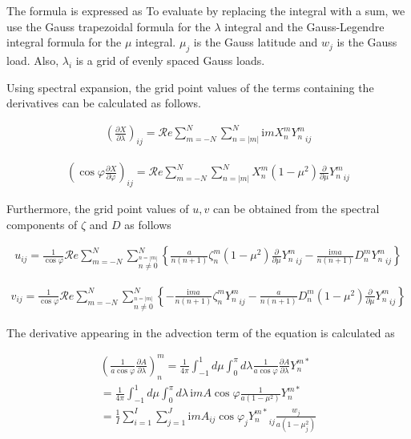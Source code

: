 The formula is expressed as To evaluate by replacing the integral with a
sum, we use the Gauss trapezoidal formula for the \(\lambda\) integral
and the Gauss-Legendre integral formula for the \(\mu\) integral.
\(\mu_j\) is the Gauss latitude and \(w_j\) is the Gauss load. Also,
\(\lambda_i\) is a grid of evenly spaced Gauss loads.

Using spectral expansion, the grid point values of the terms containing
the derivatives can be calculated as follows.

\begin{eqnarray}
        \left(  \frac{\partial X}{\partial \lambda} \right)_{ij}
     =  
        {\mathcal Re} \sum_{m=-N}^{N} \sum_{n=|m|}^{N}
       \mathrm{i}m X_n^m {Y_n^m}_{ij}
\end{eqnarray}

\begin{eqnarray}
   \left( \cos\varphi \frac{\partial X}{\partial \varphi} \right)_{ij}
     =  {\mathcal Re} \sum_{m=-N}^{N} \sum_{n=|m|}^{N}
       X_n^m
       ( 1-\mu^{2} ) \frac{\partial }{\partial \mu} {Y_n^m}_{ij}
\end{eqnarray}

Furthermore, the grid point values of \(u,v\) can be obtained from the
spectral components of \(\zeta\) and \(D\) as follows

\begin{eqnarray}
  u_{ij}
  = \frac{1}{\cos\varphi}
     {\mathcal Re} \sum_{m=-N}^{N}
                       \sum_{\stackrel{n=|m|}{n \neq 0}}^{N}
    \left\{
             \frac{a}{n(n+1)} \zeta_n^m
            (1-\mu^{2}) \frac{\partial{}}{\partial {\mu}} {Y_n^m}_{ij}
          -  \frac{\mathrm{i}m a}{n(n+1)} D_n^m {Y_n^m}_{ij}
    \right\}
\end{eqnarray}

\begin{eqnarray}
  v_{ij}
  = \frac{1}{\cos\varphi}
   {\mathcal Re} \sum_{m=-N}^{N}
                     \sum_{\stackrel{n=|m|}{n \neq 0}}^{N}
    \left\{
          -  \frac{\mathrm{i}m a}{n(n+1)} \zeta_n^m {Y_n^m}_{ij}
          -  \frac{a}{n(n+1)} D_n^m
            (1-\mu^{2}) \frac{\partial{}}{\partial {\mu}} {Y_n^m}_{ij}
    \right\}
\end{eqnarray}

The derivative appearing in the advection term of the equation is
calculated as

\begin{eqnarray}
  \left( \frac{1}{a\cos\varphi} \frac{\partial{A}}{\partial {\lambda}} \right)_n^m
   =  \frac{1}{4 \pi}
        \int_{-1}^{1} d \mu \int_{0}^{\pi} d \lambda
          \frac{1}{a\cos\varphi} \frac{\partial{A}}{\partial {\lambda}} Y_n^{m *} \\
   =  \frac{1}{4 \pi}
        \int_{-1}^{1} d \mu \int_{0}^{\pi} d \lambda \,
          \mathrm{i}m A \cos\varphi \frac{1}{a(1-\mu^{2})} Y_n^{m *} \\
   =  \frac{1}{I} \sum_{i=1}^{I} \sum_{j=1}^{J}  
          \mathrm{i}m A_{ij} \cos\varphi_j
          {Y_n^{m *}}_{ij} \frac{w_j}{a(1-\mu_j^{2})}
\end{eqnarray}

